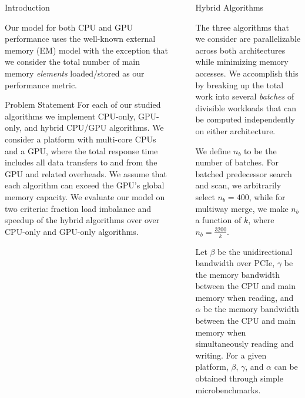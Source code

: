 \documentclass[final]{beamer}
\newlength{\sepwidth}
\newlength{\colwidth}
\newcommand{\separatorcolumn}{\begin{column}{\sepwidth}\end{column}}
\begin{document}
\begin{frame}[t]
\begin{columns}[t]
\begin{column}{\colwidth}
\begin{block}{Introduction}
\begin{description}[font=$\bullet$~\normalfont\scshape\color{red!50!black}]
\item Our model for both CPU and GPU performance uses the well-known external memory (EM) model with the exception that we consider the total number of main memory \emph{elements} loaded/stored as our performance metric.

\end{description}  

  \end{block}

  \begin{alertblock}{Problem Statement}
   For each of our studied algorithms we implement CPU-only, GPU-only, and hybrid CPU/GPU algorithms. 
   We consider a platform with multi-core CPUs and a GPU, where the total response time includes all 
   data transfers to and from the GPU and related overheads. We assume that each algorithm can exceed the GPU's global memory capacity. 
   We evaluate our model on two criteria: fraction load imbalance and speedup of the hybrid algorithms over over CPU-only and GPU-only algorithms.
  \end{alertblock}

\end{column}

\separatorcolumn

\begin{column}{\colwidth}

 \begin{block}{Hybrid Algorithms}

 \begin{description}[font=$\bullet$~\normalfont\scshape\color{red!50!black}]
\item The three algorithms that we consider are parallelizable across both architectures while minimizing memory accesses. We accomplish this by breaking up the total work into several \emph{batches} of divisible workloads that can be computed independently on either architecture. 

\item We define $n_b$ to be the number of batches. For batched predecessor search and scan, we arbitrarily select $n_b=400$, while for multiway merge, we make $n_b$ a function of $k$, where $n_b=\frac{3200}{k}$. 

\item Let $\beta$ be the unidirectional bandwidth over PCIe, $\gamma$ be the memory bandwidth between the CPU and main memory when reading, and $\alpha$ be the memory bandwidth between the CPU and main memory when simultaneously reading and writing. For a given platform, $\beta$, $\gamma$, and  $\alpha$ can be obtained through simple microbenchmarks.


\end{description}
\end{block}
\end{column}
\end{columns}
\end{frame}
\end{document}
